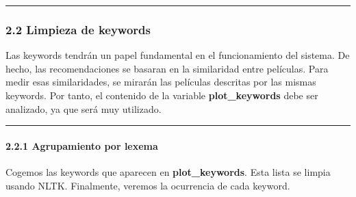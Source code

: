    \begin{center}\rule{0.5\linewidth}{0.5pt}\end{center}

\hypertarget{limpieza-de-keywords}{%
\subsubsection{2.2 Limpieza de keywords}\label{limpieza-de-keywords}}

Las keywords tendrán un papel fundamental en el funcionamiento del
sistema. De hecho, las recomendaciones se basaran en la similaridad
entre películas. Para medir esas similaridades, se mirarán las películas
descritas por las mismas keywords. Por tanto, el contenido de la
variable \textbf{plot\_keywords} debe ser analizado, ya que será muy
utilizado.

    \begin{center}\rule{0.5\linewidth}{0.5pt}\end{center}

\hypertarget{agrupamiento-por-lexema}{%
\paragraph{2.2.1 Agrupamiento por
lexema}\label{agrupamiento-por-lexema}}

Cogemos las keywords que aparecen en \textbf{plot\_keywords}. Esta lista
se limpia usando NLTK. Finalmente, veremos la ocurrencia de cada
keyword.

